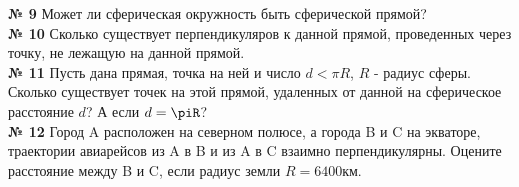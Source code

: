     \textbf{№ 9}
    Может ли сферическая окружность быть сферической прямой?\\


    \textbf{№ 10}
    Сколько существует перпендикуляров к данной прямой, проведенных через точку,
    не лежащую на данной прямой.\\


    \textbf{№ 11}
    Пусть дана прямая, точка на ней и число $d < \pi R$, $R$ - радиус сферы.
    Сколько существует точек на этой прямой, удаленных от данной на сферическое расстояние $d$?
    А если $d = \piR$?\\


    \textbf{№ 12}
    Город A расположен на северном полюсе, а города B и C на экваторе,
    траектории авиарейсов из A в B и из A в C взаимно перпендикулярны.
    Оцените расстояние между B и C, если радиус земли $R = 6400$км.


